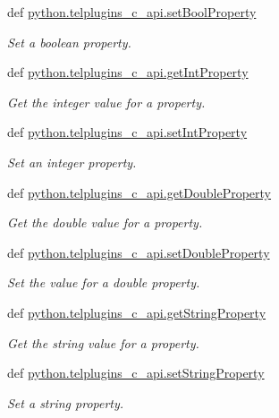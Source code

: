 \begin{DoxyCompactItemize}
def \hyperlink{group__plugin__properties_ga4ffb9eafe5e35de0133e31c48400439a}{python.\-telplugins\-\_\-c\-\_\-api.\-set\-Bool\-Property}
\begin{DoxyCompactList}\small\item\em Set a boolean property. \end{DoxyCompactList}\item 
def \hyperlink{group__plugin__properties_ga4a26f21aae2d39e5c88772e0caa9b289}{python.\-telplugins\-\_\-c\-\_\-api.\-get\-Int\-Property}
\begin{DoxyCompactList}\small\item\em Get the integer value for a property. \end{DoxyCompactList}\item 
def \hyperlink{group__plugin__properties_ga12c5fd94cd4ae3bfd0c82b0113d23045}{python.\-telplugins\-\_\-c\-\_\-api.\-set\-Int\-Property}
\begin{DoxyCompactList}\small\item\em Set an integer property. \end{DoxyCompactList}\item 
def \hyperlink{group__plugin__properties_gacb149460b60b19f682d1f222955bc9fa}{python.\-telplugins\-\_\-c\-\_\-api.\-get\-Double\-Property}
\begin{DoxyCompactList}\small\item\em Get the double value for a property. \end{DoxyCompactList}\item 
def \hyperlink{group__plugin__properties_ga246f2e52db6b13a0621fff4f677b4406}{python.\-telplugins\-\_\-c\-\_\-api.\-set\-Double\-Property}
\begin{DoxyCompactList}\small\item\em Set the value for a double property. \end{DoxyCompactList}\item 
def \hyperlink{group__plugin__properties_ga5f53518667b36f2a1781a5f6f45914ad}{python.\-telplugins\-\_\-c\-\_\-api.\-get\-String\-Property}
\begin{DoxyCompactList}\small\item\em Get the string value for a property. \end{DoxyCompactList}\item 
def \hyperlink{group__plugin__properties_gabe10d486982f18de948ea5933d1209eb}{python.\-telplugins\-\_\-c\-\_\-api.\-set\-String\-Property}
\begin{DoxyCompactList}\small\item\em Set a string property. \end{DoxyCompactList}\item 

\end{DoxyCompactItemize}
